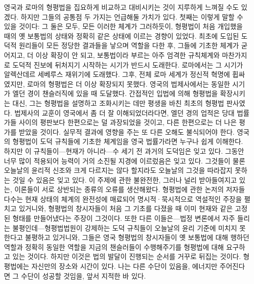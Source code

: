 영국과 로마의 형평법을 집요하게 비교하고 대비시키는 것이 지루하게 느껴질 수도
있겠다. 하지만 그들의 공통점 두 가지는 언급해둘 가치가 있다.
첫째는 이렇게 말할 수 있을 것이다:
그 둘은 모두, 모든 이러한 체계가 그러하듯이,
형평법이 처음 개입했을 때의 옛 보통법의 상태와 정확히 같은 상태에
이르는 경향이 있었다.
최초에 도입된 도덕적 원리들이 모든 정당한 결과들을 낳으며 역할을 다한 후,
그들에 기초한 체계가 굳어지고, 더 이상 확장이 안 되고,
보통법이라 부르는 아주 엄격한 규칙체계와 마찬가지로
도덕적 진보에 뒤처지기 시작하는
시기가 반드시 도래한다.
로마에서는 그 시기가 알렉산데르 세베루스 재위기에 도래했다.
그후, 전체 로마 세계가 정신적 혁명에 휩싸였지만, 로마의 형평법은
더 이상 확장되지 못했다.
영국의 법제사에서는 동일한 시기가 엘던 경이
챈슬러직에 있을 때 도달했다.
간접적인 입법에 의해 형평법을 확장시키는 대신, 그는
형평법을 설명하고 조화시키는 데만 평생을 바친 최초의 형평법 판사였다.
법제사의 교훈이 영국에서 좀 더 잘 이해되었더라다면,
엘던 경의 업적은
당대 법률가들 사이의 평판보다
한편으로는 덜 과장되었을 것이고,
다른 한편으로는 더 나은 평가를 받았을 것이다.
실무적 결과에 영향을 주는 또 다른 오해도 불식되어야 한다.
영국의 형평법이 도덕 규칙들에 기초한 체계임을
영국 법률가라면 누구나 쉽게 이해한다.
하지만 이 규칙들이---현재가 아니라---수 세기 전 과거의 도덕임은 잊고 있다.
그동안 너무 많이 적용되어 능력이 거의 소진될 지경에 이르렀음은 잊고 있다.
그것들이 물론 오늘날의 윤리적 신조와 크게 다르지는 않다 할지라도
오늘날의 그것을 따라잡지 못하는 것일 수 있음은 잊고 있다.
이 주제에 관한 불완전한, 그러나 널리 받아들여지고 있는, 이론들이
서로 상반되는 종류의 오류를 생산해왔다.
형평법에 관한 논저의 저자들 다수는
현재 상태의 체계의 완전성에 매료되어
명시적^^b7묵시적으로 역설적인 주장을 펼치고 있거니와,
형평법의 창시자들이 처음 그 기초를 다졌을 때 이미 현재와 같은 고정된 형태를
만들어냈다는 주장이 그것이다.
또한 다른 이들은---법정 변론에서 자주 들리는 불평인데---형평법법원이
강제하는 도덕 규칙들이 오늘날의 윤리 기준에 미치지 못한다고 불평하고 있거니와,
그들은 영국 형평법의 창시자들이 옛 보통법에 대해
행하던 역할과 정확히 동일한 역할을
지금의 챈슬러들이
수행해주기를 형평법에 대해 요구하고 있는 것이다.
하지만 이것은 법의 발달이 진행되는 순서를 거꾸로 뒤집는 것이다.
형평법에는 자신만의 장소와 시간이 있다.
나는 다른 수단이 있음을, 에너지만 주어진다면 그 수단이 성공할 것임을,
앞서 지적한 바 있다.

